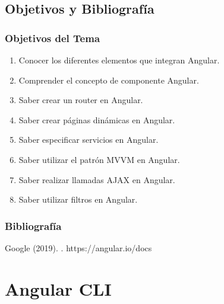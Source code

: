 \documentclass[a4paper,slidestop,xcolor=pst,blue]{beamer}
\begin{document}
\subsection{Objetivos y Bibliografía}

\begin{frame}[c]
    \frametitle{Objetivos del Tema}
    \begin{enumerate}[<+->]
         \item Conocer los diferentes elementos que integran Angular.
         \item Comprender el concepto de componente Angular.
         \item Saber crear un router en Angular.
         \item Saber crear páginas dinámicas en Angular.
         \item Saber especificar servicios en Angular.
         \item Saber utilizar el patrón MVVM en Angular.
         \item Saber realizar llamadas AJAX en Angular.
         \item Saber utilizar filtros en Angular.
    \end{enumerate}
\end{frame}

\begin{frame}[c]
    \frametitle{Bibliografía}
    \begin{thebibliography}{1}

        Google (2019).
        .
        \newblock https://angular.io/docs

    \end{thebibliography}
\end{frame}

\section{Angular CLI}

\end{document}
